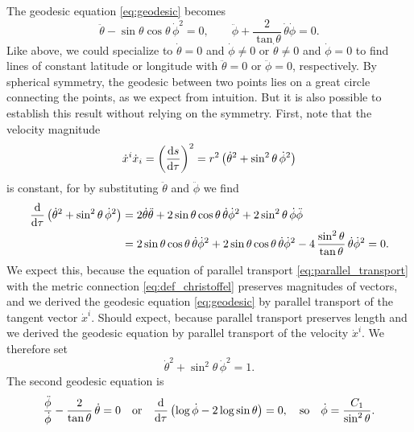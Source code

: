 The geodesic equation \eqref{eq:geodesic} becomes
\begin{equation}
	\ddot{\theta} - \sin\theta \cos \theta \, \dot\phi^2 = 0,
	\qquad
	\ddot\phi + \frac{2}{\tan \theta} \, \dot\theta \dot\phi = 0.
\end{equation}
Like above, we could specialize to $\dot\theta = 0$ and $\dot\phi \neq 0$ or $\dot\theta \neq 0$ and $\dot\phi = 0$ to find lines of constant latitude or longitude with $\ddot\theta=0$ or $\ddot\phi=0$, respectively.
By spherical symmetry, the geodesic between two points lies on a great circle connecting the points, as we expect from intuition.
But it is also possible to establish this result without relying on the symmetry.
First, note that the velocity magnitude
\begin{equation}
	\dot{x}^i \dot{x}_i = \left( \frac{\mathop{}\!\mathrm{d} s}{\mathop{}\!\mathrm{d} \tau} \right)^2 = r^2 \left( \dot\theta^2 + \sin^2 \theta \, \dot\phi^2 \right)
\end{equation}
is constant, for by substituting $\ddot\theta$ and $\ddot\phi$ we find
\begin{equation}
\begin{split}
	\odv*{\left( \dot\theta^2 + \sin^2 \theta \, \dot\phi^2 \right)}{\tau} &= 2 \dot\theta \ddot\theta + 2 \sin\theta \cos\theta \, \dot\theta \dot\phi^2 + 2 \sin^2\theta \, \dot\phi \ddot\phi \\
	                                                                       &= 2 \sin\theta \cos\theta \, \dot\theta \dot\phi^2 + 2 \sin\theta \cos\theta \, \dot\theta \dot\phi^2 - 4 \, \frac{\sin^2\theta}{\tan\theta} \, \dot\theta \dot\phi^2 = 0.
\end{split}
\end{equation}
We expect this, because the equation of parallel transport \eqref{eq:parallel_transport} with the metric connection \eqref{eq:def_christoffel} preserves magnitudes of vectors, and we derived the geodesic equation \eqref{eq:geodesic} by parallel transport of the tangent vector $\dot{x}^i$.
Should expect, because parallel transport preserves length and we derived the geodesic equation by parallel transport of the velocity $\dot{x}^i$.
We therefore set
\begin{equation}
	\dot\theta^2 + \sin^2\theta \, \dot\phi^2 = 1.
\label{eq:gr_summary:velmag}
\end{equation}
The second geodesic equation is
\begin{equation}
	\frac{\ddot\phi}{\dot\phi} - \frac{2}{\tan\theta} \, \dot\theta = 0
	\quad \text{or} \quad
	\odv*{\left( \log{\dot\phi} - 2 \log \sin \theta \right)}{\tau} = 0,
	\quad \text{so} \quad
	\dot\phi = \frac{C_1}{\sin^2\theta}.
\label{eq:gr_summary:phidotsol}
\end{equation}
